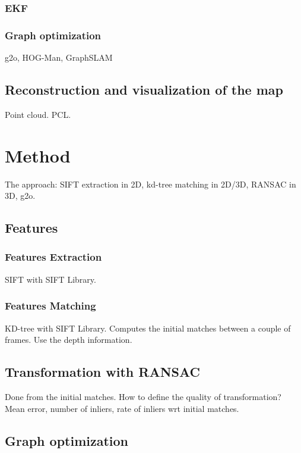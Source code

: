 \documentclass[a4paper,11pt]{kth-mag}
\begin{document}
\subsection{EKF}

\subsection{Graph optimization}

g2o, HOG-Man, GraphSLAM

\section{Reconstruction and visualization of the map}

Point cloud. PCL.

\chapter{Method}

The approach: SIFT extraction in 2D, kd-tree matching in 2D/3D, RANSAC in 3D, g2o.

\section{Features}
\subsection{Features Extraction}

SIFT with SIFT Library.

\subsection{Features Matching}

KD-tree with SIFT Library.
Computes the initial matches between a couple of frames. Use the depth information.

\section{Transformation with RANSAC}

Done from the initial matches.
How to define the quality of transformation? 
Mean error, number of inliers, rate of inliers wrt initial matches.

\section{Graph optimization}
\end{document}
